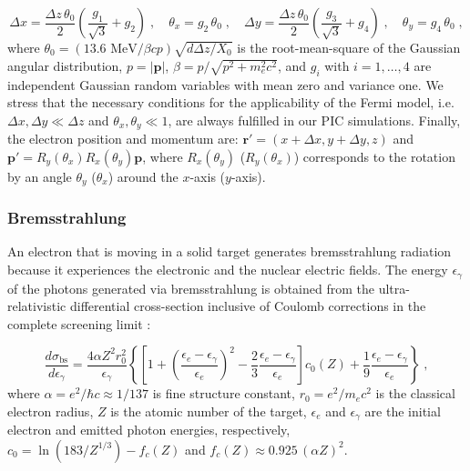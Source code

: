 \documentclass[fleqn,11pt]{wlscirep}
\begin{document}
\begin{equation}\label{deltaxy_thetaxy}
\Delta x=\frac{\Delta z\,\theta_0}{2}\left(\frac{g_1}{\sqrt{3}}+g_2\right)\;,\quad
\theta_x = g_2\,\theta_0\;,\quad
\Delta y=\frac{\Delta z\,\theta_0}{2}\left(\frac{g_3}{\sqrt{3}}+g_4\right)\;,\quad
\theta_y = g_4\,\theta_0\;,
\end{equation}
where $\theta_0=(13.6 \text{ MeV}/\beta c p)\sqrt{d\Delta z/X_0}$ is the root-mean-square of the Gaussian angular distribution, $p=|\boldsymbol{p}|$, $\beta=p/\sqrt{p^2+m_e^2c^2}$, and
$g_i$ with $i=1,\ldots,4$ are independent Gaussian random variables with mean zero and variance one. 
We stress that the necessary conditions for the applicability of the Fermi model, i.e. $\Delta x,\Delta y\ll\Delta z$ and $\theta_x,\theta_y\ll1$, are always fulfilled in our PIC simulations. 
Finally, the electron position and momentum are: $\boldsymbol{r}'=(x+\Delta x,y+\Delta y,z)$ and $\boldsymbol{p}'=R_y(\theta_x)R_x(\theta_y)\boldsymbol{p}$, where $R_x(\theta_y)$ ($R_y(\theta_x)$) corresponds to the rotation by an angle $\theta_y$ ($\theta_x$) around the $x$-axis ($y$-axis).

\subsubsection*{Bremsstrahlung}

An electron that is moving in a solid target generates bremsstrahlung radiation because it experiences the electronic and the nuclear electric fields.
The energy $\epsilon_\gamma$ of the photons generated via bremsstrahlung is obtained from the ultra-relativistic differential cross-section inclusive of Coulomb corrections in the complete screening limit \cite{RevModPhys.31.920}: 

\begin{equation}\label{dsigmabs_dk}
\frac{d\sigma_\text{bs}}{d\epsilon_\gamma}=\frac{4\alpha Z^2r_0^2}{\epsilon_\gamma}\left\{\left[1+\left(\frac{\epsilon_e-\epsilon_\gamma}{\epsilon_e}\right)^2-\frac{2}{3}\frac{\epsilon_e-\epsilon_\gamma}{\epsilon_e}\right]
c_0(Z)+\frac{1}{9}\frac{\epsilon_e-\epsilon_\gamma}{\epsilon_e}\right\}\;,
\end{equation}
where $\alpha=e^2/\hbar c \approx 1/137$ is fine structure constant, $r_0=e^2 / m_e c^2$ is the classical electron radius, $Z$ is the atomic number of the target, $\epsilon_e$ and $\epsilon_\gamma$ are the initial electron and emitted photon energies, respectively, $c_0=\ln\left(183/Z^{1/3}\right)-f_c(Z)$ and $f_c(Z)\approx0.925\,(\alpha Z)^2$. 
\end{document}
